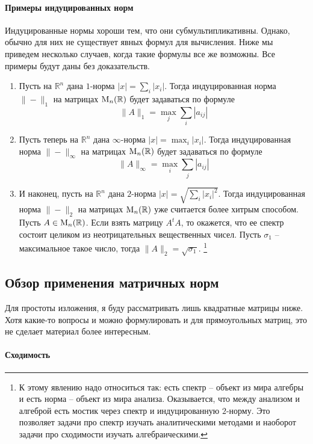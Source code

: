 \paragraph{Примеры индуцированных норм}

Индуцированные нормы хороши тем, что они субмультипликативны.
Однако, обычно для них не существует явных формул для вычисления.
Ниже мы приведем несколько случаев, когда такие формулы все же возможны.
Все примеры будут даны без доказательств.
\begin{enumerate}
\item Пусть на $\mathbb R^n$ дана $1$-норма $|x| = \sum_i |x_i|$.
Тогда индуцированная норма $\|{-}\|_1$ на матрицах $\operatorname{M}_{n}(\mathbb R)$ будет задаваться по формуле 
\[
\|A\|_1 = \max_j\sum_i|a_{ij}|
\]

\item Пусть теперь на $\mathbb R^n$ дана $\infty$-норма $|x| = \max_i |x_i|$.
Тогда индуцированная норма $\|{-}\|_\infty$ на матрицах $\operatorname{M}_{n}(\mathbb R)$ будет задаваться по формуле
\[
\|A\|_\infty = \max_i\sum_j|a_{ij}|
\]

\item И наконец, пусть на $\mathbb R^n$ дана $2$-норма $|x| = \sqrt{\sum_i |x_i|^2}$.
Тогда индуцированная норма $\|{-}\|_2$ на матрицах $\operatorname{M}_{n}(\mathbb R)$ уже считается более хитрым способом.
Пусть $A\in\operatorname{M}_{n}(\mathbb R)$.
Если взять матрицу $A^tA$, то окажется, что ее спектр состоит целиком из неотрицательных вещественных чисел.
Пусть $\sigma_1$ -- максимальное такое число, тогда $\|A\|_2 = \sqrt{\sigma_1}$.%
\footnote{К этому явлению надо относиться так: есть спектр -- объект из мира алгебры и есть норма -- объект из мира анализа.
Оказывается, что между анализом и алгеброй есть мостик через спектр и индуцированную $2$-норму.
Это позволяет задачи про спектр изучать аналитическими методами и наоборот задачи про сходимости изучать алгебраическими.}
\end{enumerate} 

\subsection{Обзор применения матричных норм}

Для простоты изложения, я буду рассматривать лишь квадратные матрицы ниже.
Хотя какие-то вопросы и можно формулировать и для прямоугольных матриц, это не сделает материал более интересным.

\paragraph{Сходимость}

